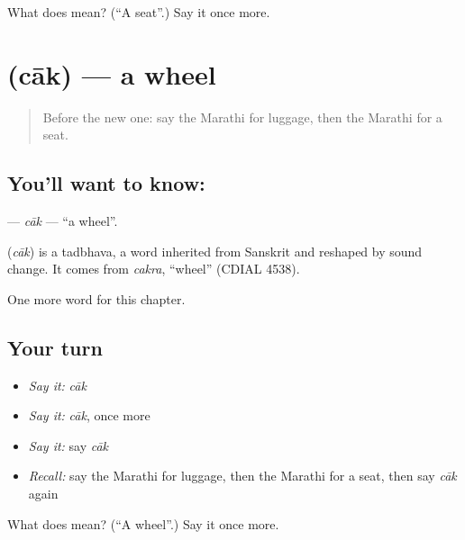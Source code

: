 \begin{tcolorbox}[breakable,colback=teal!4,colframe=teal!35!black,title={Before you move on}]
What does  mean? (\textquotedblleft{}A seat\textquotedblright{}.) Say it once more.
\end{tcolorbox}
\section[\texorpdfstring{\mr{चाक} (cāk)}{चाक (cāk)}]{ (cāk) — a wheel}

\label{lesson:MR-C240-cak}



\begin{quote}
Before the new one: say the Marathi for luggage, then the Marathi for a seat.
\end{quote}

\subsection*{You'll want to know: }
\textbf{} — \emph{cāk} — \textquotedblleft{}a wheel\textquotedblright{}.

\begin{cousinweb}
\textbf{} (\emph{cāk}) is a tadbhava, a word inherited from Sanskrit and reshaped by sound change. It comes from \emph{cakra}, \textquotedblleft{}wheel\textquotedblright{} (CDIAL 4538).
\end{cousinweb}

\begin{grammarlens}[title={What you've built}]
One more word for this chapter.
\end{grammarlens}

\subsection*{Your turn}
\begin{itemize}
\raggedright
  \item \emph{Say it:} \emph{cāk}
  \item \emph{Say it:} \emph{cāk}, once more
  \item \emph{Say it:} say \emph{cāk}
  \item \emph{Recall:} say the Marathi for luggage, then the Marathi for a seat, then say \emph{cāk} again
\end{itemize}

\begin{tcolorbox}[breakable,colback=teal!4,colframe=teal!35!black,title={Before you move on}]
What does  mean? (\textquotedblleft{}A wheel\textquotedblright{}.) Say it once more.
\end{tcolorbox}
